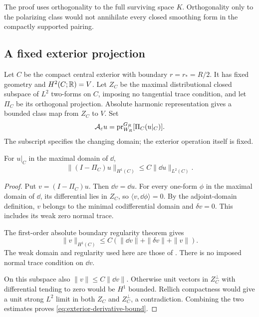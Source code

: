 The proof uses orthogonality to the full surviving space $K$.
Orthogonality only to the polarizing class would not annihilate every
closed smoothing form in the compactly supported pairing.

\subsection{A fixed exterior projection}

Let $C$ be the compact central exterior with boundary $r=r_*=R/2$.
It has fixed geometry and $H^2(C;\mathbb R)=V$. Let $Z_C$ be the maximal
distributional closed subspace of $L^2$ two-forms on $C$, imposing
no tangential trace condition, and let $\Pi_C$ be its orthogonal
projection. Absolute harmonic representation gives a bounded class
map from $Z_C$ to $V$. Set
\begin{equation}\label{eq:model-observer}
 \mathcal A_\varepsilon u
   =\operatorname{pr}_{W_R}^{G_R}[\Pi_C(u|_C)].
\end{equation}
The subscript specifies the changing domain; the exterior operation
itself is fixed.

\begin{lemma}\label{lem:exterior-projection}
For $u|_C$ in the maximal domain of $\dd$,
\begin{equation}\label{eq:exterior-derivative-bound}
 \|(I-\Pi_C)u\|_{H^1(C)}\le C\|\dd u\|_{L^2(C)}.
\end{equation}
\end{lemma}
\begin{proof}
Put $v=(I-\Pi_C)u$. Then $\dd v=\dd u$. For every one-form
$\phi$ in the maximal domain of $\dd$, its differential lies in
$Z_C$, so $\langle v,\dd\phi\rangle=0$. By the adjoint-domain
definition, $v$ belongs to the minimal codifferential domain and
$\delta v=0$. This includes its weak zero normal trace.

The first-order absolute boundary regularity theorem gives
\[
 \|v\|_{H^1(C)}
       \le C(\|\dd v\|+\|\delta v\|+\|v\|).
\]
The weak domain and regularity used here are those of
\cite[Definition~1.2.5, Lemma~1.2.10 and Theorem~4.3.8]{frey}.
There is no imposed normal trace condition on $\dd v$.

On this subspace also $\|v\|\le C\|\dd v\|$. Otherwise unit
vectors in $Z_C^\perp$ with differential tending to zero would be
$H^1$ bounded. Rellich compactness would give a unit strong $L^2$
limit in both $Z_C$ and $Z_C^\perp$, a contradiction. Combining
the two estimates proves \eqref{eq:exterior-derivative-bound}.
\end{proof}

